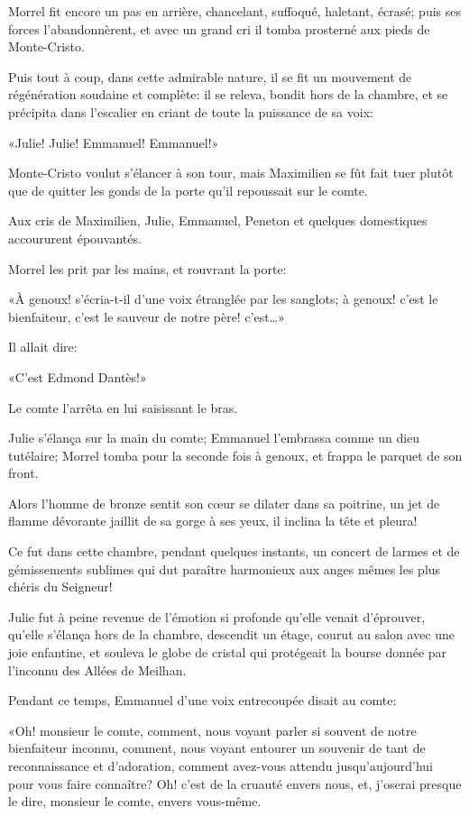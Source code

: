 Morrel fit encore un pas en arrière, chancelant, suffoqué, haletant, écrasé; puis ses forces l'abandonnèrent, et avec un grand cri il tomba prosterné aux pieds de Monte-Cristo. 

Puis tout à coup, dans cette admirable nature, il se fit un mouvement de régénération soudaine et complète: il se releva, bondit hors de la chambre, et se précipita dans l'escalier en criant de toute la puissance de sa voix: 

«Julie! Julie! Emmanuel! Emmanuel!» 

Monte-Cristo voulut s'élancer à son tour, mais Maximilien se fût fait tuer plutôt que de quitter les gonds de la porte qu'il repoussait sur le comte. 

Aux cris de Maximilien, Julie, Emmanuel, Peneton et quelques domestiques accoururent épouvantés. 

Morrel les prit par les mains, et rouvrant la porte: 

«À genoux! s'écria-t-il d'une voix étranglée par les sanglots; à genoux! c'est le bienfaiteur, c'est le sauveur de notre père! c'est\dots» 

Il allait dire: 

«C'est Edmond Dantès!» 

Le comte l'arrêta en lui saisissant le bras. 

Julie s'élança sur la main du comte; Emmanuel l'embrassa comme un dieu tutélaire; Morrel tomba pour la seconde fois à genoux, et frappa le parquet de son front. 

Alors l'homme de bronze sentit son cœur se dilater dans sa poitrine, un jet de flamme dévorante jaillit de sa gorge à ses yeux, il inclina la tête et pleura! 

Ce fut dans cette chambre, pendant quelques instants, un concert de larmes et de gémissements sublimes qui dut paraître harmonieux aux anges mêmes les plus chéris du Seigneur! 

Julie fut à peine revenue de l'émotion si profonde qu'elle venait d'éprouver, qu'elle s'élança hors de la chambre, descendit un étage, courut au salon avec une joie enfantine, et souleva le globe de cristal qui protégeait la bourse donnée par l'inconnu des Allées de Meilhan. 

Pendant ce temps, Emmanuel d'une voix entrecoupée disait au comte: 

«Oh! monsieur le comte, comment, nous voyant parler si souvent de notre bienfaiteur inconnu, comment, nous voyant entourer un souvenir de tant de reconnaissance et d'adoration, comment avez-vous attendu jusqu'aujourd'hui pour vous faire connaître? Oh! c'est de la cruauté envers nous, et, j'oserai presque le dire, monsieur le comte, envers vous-même. 

